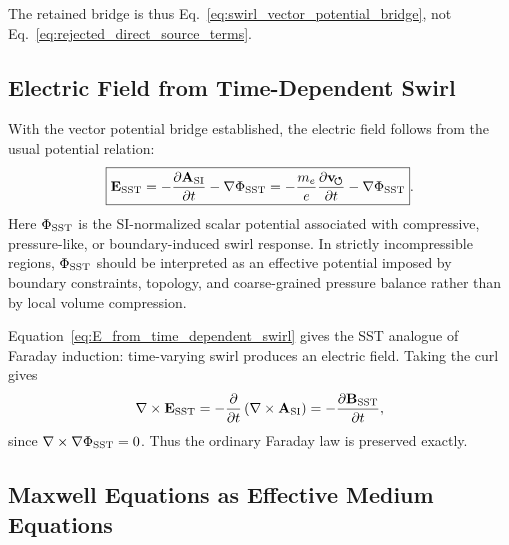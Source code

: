     The retained bridge is thus Eq.~\eqref{eq:swirl_vector_potential_bridge},
    not Eq.~\eqref{eq:rejected_direct_source_terms}.

\subsection{Electric Field from Time-Dependent Swirl}
    
    With the vector potential bridge established, the electric field follows
    from the usual potential relation:
    \begin{equation}
        \boxed{
            \mathbf{E}_{\rm SST}
            =
            -\frac{\partial\mathbf{A}_{\rm SI}}{\partial t}
            -
            \nabla\Phi_{\rm SST}
            =
            -\frac{m_e}{e}
            \frac{\partial\mathbf{v}_{\!\boldsymbol{\circlearrowleft}}}{\partial t}
            -
            \nabla\Phi_{\rm SST}
        } .
        \label{eq:E_from_time_dependent_swirl}
    \end{equation}
    Here \(\Phi_{\rm SST}\) is the SI-normalized scalar potential associated
    with compressive, pressure-like, or boundary-induced swirl response.  In
    strictly incompressible regions, \(\Phi_{\rm SST}\) should be interpreted
    as an effective potential imposed by boundary constraints, topology, and
    coarse-grained pressure balance rather than by local volume compression.
    
    Equation~\eqref{eq:E_from_time_dependent_swirl} gives the SST analogue of
    Faraday induction: time-varying swirl produces an electric field.  Taking
    the curl gives
    \begin{equation}
        \nabla\times\mathbf{E}_{\rm SST}
        =
        -
        \frac{\partial}{\partial t}
        \left(
            \nabla\times\mathbf{A}_{\rm SI}
        \right)
        =
        -
        \frac{\partial\mathbf{B}_{\rm SST}}{\partial t},
        \label{eq:faraday_from_swirl}
    \end{equation}
    since \(\nabla\times\nabla\Phi_{\rm SST}=0\).  Thus the ordinary Faraday
    law is preserved exactly.

\subsection{Maxwell Equations as Effective Medium Equations}
    
